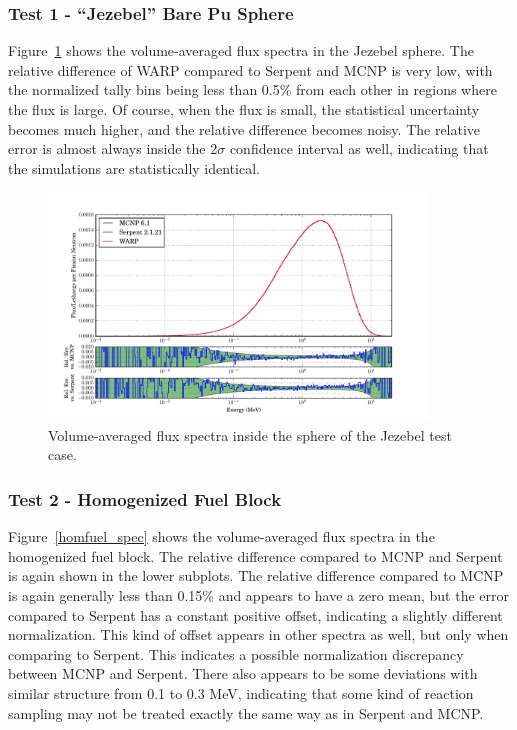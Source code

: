 \documentclass[preprint,12pt]{elsarticle}
\begin{document}
\newpage
\subsubsection{Test 1 - ``Jezebel'' Bare Pu Sphere}

Figure~\ref{jezebel_spec} shows the volume-averaged flux spectra in the Jezebel sphere.  The relative difference of WARP compared to Serpent and MCNP is very low, with the normalized tally bins being less than 0.5\% from each other in regions where the flux is large.  Of course, when the flux is small, the statistical uncertainty becomes much higher, and the relative difference becomes noisy.   The relative error is almost always inside the 2$\sigma$ confidence interval as well, indicating that the simulations are statistically identical.  

\begin{figure}[h!]
\centering
\includegraphics[width=0.9\textwidth,trim= 1cm 0cm 1cm 0cm]{graphics/jezebel_spec.pdf}
\caption{Volume-averaged flux spectra inside the sphere of the Jezebel test case. \label{jezebel_spec} }
\end{figure}

\newpage
\subsubsection{Test 2 - Homogenized Fuel Block}

Figure~\ref{homfuel_spec} shows the volume-averaged flux spectra in the homogenized fuel block.  The relative difference compared to MCNP and Serpent is again shown in the lower subplots.  The relative difference compared to MCNP is again generally less than 0.15\% and appears to have a zero mean, but the error compared to Serpent has a constant positive offset, indicating a slightly different normalization.  This kind of offset appears in other spectra as well, but only when comparing to Serpent.  This indicates a possible normalization discrepancy between MCNP and Serpent.  There also appears to be some  deviations with similar structure from 0.1 to 0.3 MeV, indicating that some kind of reaction sampling may not be treated exactly the same way as in Serpent and MCNP.
\end{document}
